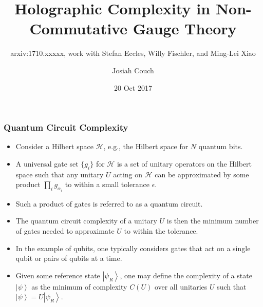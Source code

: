 \documentclass[10pt]{beamer}
\title{Holographic Complexity in Non-Commutative Gauge Theory}
\subtitle{arxiv:1710.xxxxx, work with Stefan Eccles, Willy Fischler, and Ming-Lei Xiao}
\author{Josiah Couch}
\institute{University of Texas at Austin}
\date{20 Oct 2017}
\newcommand{\ket}[1]{\left| #1 \right>}
\begin{document}
\begin{frame}
\titlepage\end{frame}





\begin{frame}
\frametitle{Quantum Circuit Complexity}

\begin{itemize}

\item Consider a Hilbert space $\mathcal{H}$, e.g., the Hilbert space for $N$ quantum bits.

\item A universal gate set $\{g_i\}$ for $\mathcal{H}$ is a set of unitary operators on the Hilbert space such that any unitary $U$ acting on $\mathcal{H}$ can be approximated by some product $\displaystyle\prod_{i} g_{\alpha_i}$ to within a small tolerance $\epsilon$. 

\item Such a product of gates is referred to as a quantum circuit.

\item The quantum circuit complexity of a unitary $U$ is then the minimum number of gates needed to approximate $U$ to within the tolerance.

\item In the example of qubits, one typically considers gates that act on a single qubit or pairs of qubits at a time.

\item Given some reference state $\ket{\psi_R}$, one may define the complexity of a state $\ket{\psi}$ as the minimum of complexity $C(U)$ over all unitaries $U$ such that $\ket{\psi} = U\ket{\psi_R}$.

\end{itemize}

\end{frame}
\end{document}
